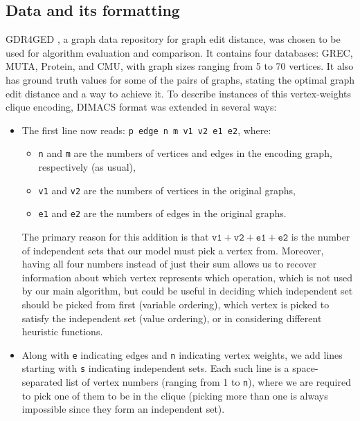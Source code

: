 \documentclass{article}
\theoremstyle{definition}
\begin{document}
\subsection{Data and its formatting}
GDR4GED \cite{DBLP:conf/gbrpr/Abu-AishehRR15}, a graph data repository for graph edit distance, was chosen to be used for algorithm evaluation and comparison. It contains four databases: GREC, MUTA, Protein, and CMU, with graph sizes ranging from 5 to 70 vertices. It also has ground truth values for some of the pairs of graphs, stating the optimal graph edit distance and a way to achieve it. To describe instances of this vertex-weights clique encoding, DIMACS format was extended in several ways:
\begin{itemize}
\item The first line now reads: \texttt{p edge n m v1 v2 e1 e2}, where:
  \begin{itemize}
  \item \texttt{n} and \texttt{m} are the numbers of vertices and edges in the encoding graph, respectively (as usual),
  \item \texttt{v1} and \texttt{v2} are the numbers of vertices in the original graphs,
  \item \texttt{e1} and \texttt{e2} are the numbers of edges in the original graphs.
  \end{itemize}
  The primary reason for this addition is that $\texttt{v1}+\texttt{v2}+\texttt{e1}+\texttt{e2}$ is the number of independent sets that our model must pick a vertex from. Moreover, having all four numbers instead of just their sum allows us to recover information about which vertex represents which operation, which is not used by our main algorithm, but could be useful in deciding which independent set should be picked from first (variable ordering), which vertex is picked to satisfy the independent set (value ordering), or in considering different heuristic functions.
  \item Along with \texttt{e} indicating edges and \texttt{n} indicating vertex weights, we add lines starting with \texttt{s} indicating independent sets. Each such line is a space-separated list of vertex numbers (ranging from 1 to \texttt{n}), where we are required to pick one of them to be in the clique (picking more than one is always impossible since they form an independent set).
\end{itemize}
\end{document}
